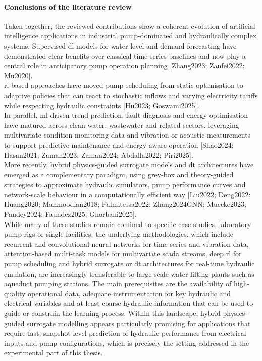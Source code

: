 \paragraph{Conclusions of the literature review}

Taken together, the reviewed contributions show a coherent evolution of artificial-intelligence applications in industrial pump-dominated and hydraulically complex systems. Supervised \acrshort{dl} models for water level and demand forecasting have demonstrated clear benefits over classical time-series baselines and now play a central role in anticipatory pump operation planning [Zhang2023; Zanfei2022; Mu2020].\\

\acrshort{rl}-based approaches have moved pump scheduling from static optimisation to adaptive policies that can react to stochastic inflows and varying electricity tariffs while respecting hydraulic constraints [Hu2023; Goswami2025].\\ 

In parallel, \acrshort{ml}-driven trend prediction, fault diagnosis and energy optimisation have matured across clean-water, wastewater and related sectors, leveraging multivariate condition-monitoring data and vibration or acoustic measurements to support predictive maintenance and energy-aware operation [Shao2024; Hasan2021; Zaman2023; Zaman2024; Abdalla2022; Piri2025].\\

More recently, hybrid physics-guided surrogate models and \acrshort{dt} architectures have emerged as a complementary paradigm, using grey-box and theory-guided strategies to approximate hydraulic simulators, pump performance curves and network-scale behaviour in a computationally efficient way [Liu2022; Deng2022; Huang2020; Mahmoodian2018; Palmitessa2022; Zhang2024GNN; Muecke2023; Pandey2024; Faundez2025; Ghorbani2025].\\

While many of these studies remain confined to specific case studies, laboratory pump rigs or single facilities, the underlying methodologies, which include recurrent and convolutional neural networks for time-series and vibration data, attention-based multi-task models for multivariate \acrshort{scada} streams, deep \acrshort{rl} for pump scheduling and hybrid surrogate or \acrshort{dt} architectures for real-time hydraulic emulation, are increasingly transferable to large-scale water-lifting plants such as aqueduct pumping stations. The main prerequisites are the availability of high-quality operational data, adequate instrumentation for key hydraulic and electrical variables and at least coarse hydraulic information that can be used to guide or constrain the learning process. Within this landscape, hybrid physics-guided surrogate modelling appears particularly promising for applications that require fast, snapshot-level prediction of hydraulic performance from electrical inputs and pump configurations, which is precisely the setting addressed in the experimental part of this thesis.
